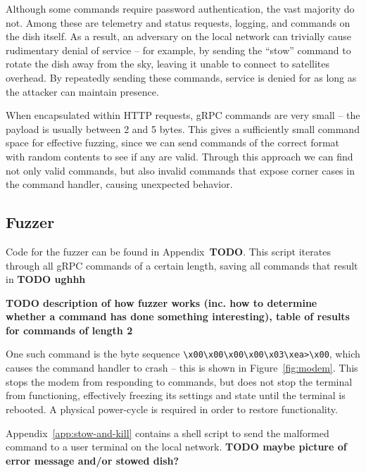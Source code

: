Although some commands require password authentication, the vast majority do not.
Among these are telemetry and status requests, logging, and commands on the dish itself.
As a result, an adversary on the local network can trivially cause rudimentary denial of service -- for example, by sending the ``stow'' command to rotate the dish away from the sky, leaving it unable to connect to satellites overhead.
By repeatedly sending these commands, service is denied for as long as the attacker can maintain presence.

When encapsulated within HTTP requests, gRPC commands are very small -- the payload is usually between 2 and 5 bytes.
This gives a sufficiently small command space for effective fuzzing, since we can send commands of the correct format with random contents to see if any are valid.
Through this approach we can find not only valid commands, but also invalid commands that expose corner cases in the command handler, causing unexpected behavior.


\subsection{Fuzzer}\label{sec:fuzzer}

Code for the fuzzer can be found in Appendix~\textbf{TODO}.
This script iterates through all gRPC commands of a certain length, saving all commands that result in \textbf{TODO ughhh}

\textbf{TODO description of how fuzzer works (inc. how to determine whether a command has done something interesting), table of results for commands of length 2}

One such command is the byte sequence \lstinline{\x00\x00\x00\x00\x03\xea>\x00}, which causes the command handler to crash -- this is shown in Figure~\ref{fig:modem}.
This stops the modem from responding to commands, but does not stop the terminal from functioning, effectively freezing its settings and state until the terminal is rebooted.
A physical power-cycle is required in order to restore functionality.

Appendix~\ref{app:stow-and-kill} contains a shell script to send the malformed command to a user terminal on the local network.
\textbf{TODO maybe picture of error message and/or stowed dish?}
